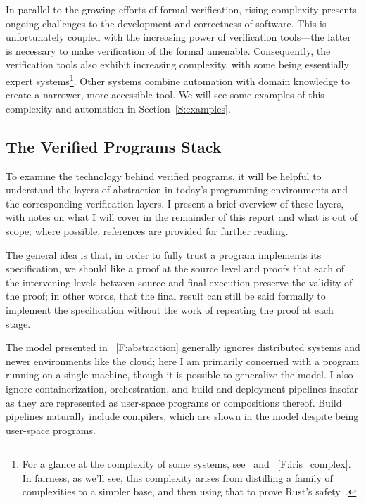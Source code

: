 In parallel to the growing efforts of formal verification, rising complexity
presents ongoing challenges to the development and correctness of software. This
is unfortunately coupled with the increasing power of verification tools---the
latter is necessary to make verification of the formal amenable. Consequently,
the verification tools also exhibit increasing complexity, with some being
essentially expert systems\footnote{For a glance at the complexity of some
systems, see~\cite{Jung_2015,Jung_2016,Krebbers_2017a,Jung_2018b} and
\figurename~\ref{F:iris_complex}. In fairness, as we'll see, this complexity
arises from distilling a family of complexities to a simpler base, and then
using that to prove Rust's safety~\cite{Jung_2018a}.}. Other systems combine
automation with domain knowledge to create a narrower, more accessible tool. We
will see some examples of this complexity and automation in
Section~\ref{S:examples}.

\subsection{The Verified Programs Stack}\label{S:stack}

To examine the technology behind verified programs, it will be helpful to
understand the layers of abstraction in today's programming environments and the
corresponding verification layers. I present a brief overview of these layers,
with notes on what I will cover in the remainder of this report and what is out
of scope; where possible, references are provided for further reading.

The general idea is that, in order to fully trust a program implements its
specification, we should like a proof at the source level and proofs that each
of the intervening levels between source and final execution preserve the
validity of the proof; in other words, that the final result can still be said
formally to implement the specification without the work of repeating the proof
at each stage.

The model presented in \figurename~\ref{F:abstraction} generally ignores
distributed systems and newer environments like the cloud; here I am primarily
concerned with a program running on a single machine, though it is possible to
generalize the model. I also ignore containerization, orchestration, and build
and deployment pipelines insofar as they are represented as user-space programs
or compositions thereof. Build pipelines naturally include compilers, which are
shown in the model despite being user-space programs.

